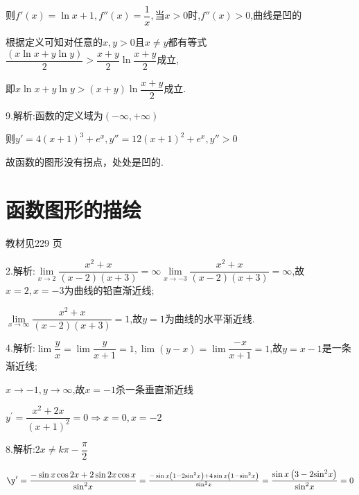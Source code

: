 则$f'(x) = \ln x + 1,f''(x) = \dfrac{1}{x},$当$x > 0$时,$f''(x) > 0$,曲线是凹的

根据定义可知对任意的$x,y > 0$且$x \ne y$都有等式$\dfrac{{\left( {x\ln x + y\ln y} \right)}}{2} > \dfrac{{x + y}}{2}\ln \dfrac{{x + y}}{2}$成立,

即$x\ln x + y\ln y > \left( {x + y} \right)\ln \dfrac{{x + y}}{2}$成立.

9.解析:函数的定义域为$\left( { - \infty , + \infty } \right)$

则$y' = 4{\left( {x + 1} \right)^3} + {e^x},y'' = 12{\left( {x + 1} \right)^2} + {e^x},y'' > 0$

 故函数的图形没有拐点，处处是凹的.

\section{函数图形的描绘}
\begin{flushright}
  \color{zhanqing!80}
  \color{zhanqing!80}
   教材见229 页 %
\end{flushright}
2.解析:$\mathop {\lim }\limits_{x \to 2} \dfrac{{{x^2} + x}}{{\left( {x - 2} \right)\left( {x + 3} \right)}} = \infty \mathop {\lim }\limits_{x \to  - 3} \dfrac{{{x^2} + x}}{{\left( {x - 2} \right)\left( {x + 3} \right)}} = \infty $,故$x = 2,x = -3$为曲线的铅直渐近线;

$\mathop {\lim }\limits_{x \to \infty } \dfrac{{{x^2} + x}}{{\left( {x - 2} \right)\left( {x + 3} \right)}} = 1$,故$y = 1$为曲线的水平渐近线.

4.解析:$\lim \dfrac{y}{x} = \lim \dfrac{y}{{x + 1}} = 1,\lim \left( {y - x} \right) = \lim \dfrac{{ - x}}{{x + 1}} = 1$,故$y = x - 1$是一条渐近线;

$x \to  - 1,y \to \infty $,故$x = - 1$杀一条垂直渐近线

${y^'} = \dfrac{{{x^2} + 2x}}{{{{\left( {x + 1} \right)}^2}}} = 0 \Rightarrow x = 0,x =  - 2$

8.解析:$2x \ne k\pi  - \dfrac{\pi }{2}$

$\y' = \dfrac{{ - \sin x\cos 2x + 2\sin 2x\cos x}}{{{{\sin }^2}x}} = \frac{{ - \sin x\left( {1 - 2{{\sin }^2}x} \right) + 4\sin x\left( {1 - {{\sin }^2}x} \right)}}{{{{\sin }^2}x}} = \dfrac{{\sin x\left( {3 - 2{{\sin }^2}x} \right)}}{{{{\sin }^2}x}} = 0$



                                                    






